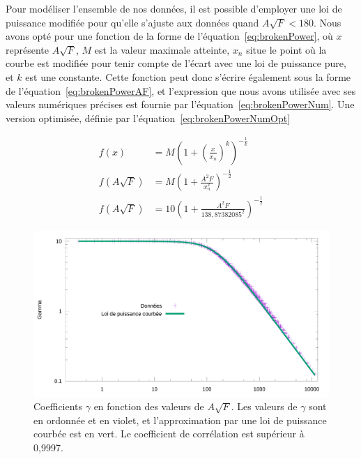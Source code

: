	
	Pour modéliser l'ensemble de nos données, il est possible d'employer une loi de puissance modifiée pour qu'elle s'ajuste aux données quand $A\sqrt{F}<180$. Nous avons opté pour une fonction de la forme de l'équation~\ref{eq:brokenPower}, où $x$ représente $A\sqrt{F}$, $M$ est la valeur maximale atteinte, $x_{n}$ situe le point où la courbe est modifiée pour tenir compte de l'écart avec une loi de puissance pure, et $k$ est une constante. Cette fonction peut donc s'écrire également sous la forme de l'équation~\ref{eq:brokenPowerAF}, et l'expression que nous avons utilisée avec ses valeurs numériques précises est fournie par l'équation~\ref{eq:brokenPowerNum}. Une version optimisée, définie par l'équation~\ref{eq:brokenPowerNumOpt}
	
	\begin{align}
		\label{eq:brokenPower}
		f(x) &= M \left( 1 + \left( \frac{x}{x_{n}} \right)^{k} \right)^{-\frac{1}{k}} \\
		\label{eq:brokenPowerAF}
		f(A\sqrt{F}) &= M \left( 1 + \frac{A^{2}F}{x_{n}^{2}}\right)^{-\frac{1}{2}} \\
		\label{eq:brokenPowerNum}
		f(A\sqrt{F}) &= 10 \left( 1 + \frac{A^{2}F}{138,87382085^{2}} \right)^{-\frac{1}{2}}
	\end{align}
	
	\begin{figure}[!htb]
		\centering
		\includegraphics[width=\textwidth]{figures/ch4/asqrtFVgammaLogLogPowerFit}
		\caption[Coefficients $\gamma$ vs. F et A, quinquies (log-log et loi de puissance)]{Coefficients $\gamma$ en fonction des valeurs de $A\sqrt{F}$. Les valeurs de $\gamma$ sont en ordonnée et en violet, et l'approximation par une loi de puissance courbée est en vert. Le coefficient de corrélation est supérieur à 0,9997.}
		\label{fig:asqrtFVgammaLogLogPowerFit}
	\end{figure}
	
